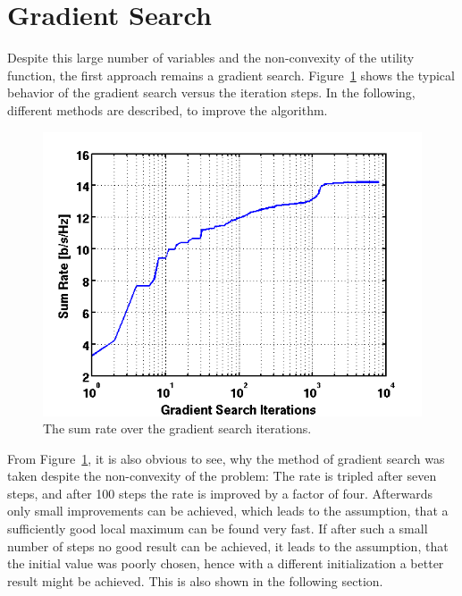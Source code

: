 \section{Gradient Search}
\label{sec:grads_solver}

Despite this large number of variables and the non-convexity of the utility function, the first approach remains a gradient search.
Figure~\ref{fig:grad_search} shows the typical behavior of the gradient search versus the iteration steps.
In the following, different methods are described, to improve the algorithm.

\begin{figure}[h]
\centering
  \includegraphics[width=0.8\linewidth]{images/rvsgradCnt_7rel_18dB_6.png}
\caption{The sum rate over the gradient search iterations.}
\label{fig:grad_search}
\end{figure}

From Figure~\ref{fig:grad_search}, it is also obvious to see, why the method of gradient search was taken despite the non-convexity of the problem:
The rate is tripled after seven steps, and after 100 steps the rate is improved by a factor of four.
Afterwards only small improvements can be achieved, which leads to the assumption, that a sufficiently good local maximum can be found very fast.
If after such a small number of steps no good result can be achieved, it leads to the assumption, that the initial value was poorly chosen, hence with a different initialization a better result might be achieved.
This is also shown in the following section.

